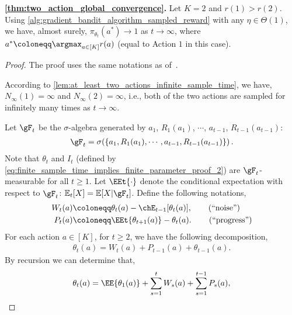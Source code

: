 \textbf{\cref{thm:two_action_global_convergence}.}
Let $K = 2$ and $r(1) > r(2)$. Using \cref{alg:gradient_bandit_algorithm_sampled_reward} with any $\eta \in \Theta(1)$, we have, almost surely, $\pi_{\theta_t}(a^*) \to 1$ as $t \to \infty$, where $a^* \coloneqq \argmax_{a \in [K]}{ r(a) }$ (equal to Action $1$ in this case).
\begin{proof}
The proof uses the same notations as of~\citep[Theorem 5.1]{mei2024stochastic}.

According to \cref{lem:at_least_two_actions_infinite_sample_time}, we have, $N_\infty(1) = \infty$ and $N_\infty(2) = \infty$, i.e., both of the two actions are sampled for infinitely many times as $t \to \infty$.

Let $\gF_t$ be the $\sigma$-algebra generated by $a_1$, $R_1(a_1)$, $\cdots$, $a_{t-1}$, $R_{t-1}(a_{t-1})$:
\begin{align}
\label{eq:two_action_global_convergence_proof_1}
    \gF_t = \sigma( \{ a_1, R_1(a_1), \cdots, a_{t-1}, R_{t-1}(a_{t-1}) \} )\,.
\end{align}
Note that $\theta_{t}$ and $I_t$ (defined by \cref{eq:finite_sample_time_implies_finite_parameter_proof_2}) are $\gF_t$-measurable for all $t\ge 1$. Let $\EEt{\cdot}$ denote the conditional expectation with respect to $\gF_t$: $\mathbb{E}_t[X] = \mathbb{E}[X|\gF_t]$. Define the following notations,
\begin{align}
\label{eq:two_action_global_convergence_proof_2b}
    W_t(a) &\coloneqq \theta_t(a) - \chE_{t-1}{[ \theta_t(a)]}, \qquad \left( \text{``noise''} \right) \\
\label{eq:two_action_global_convergence_proof_2c}
    P_t(a) &\coloneqq \EEt{\theta_{t+1}(a)} - \theta_t(a). \qquad \left( \text{``progress''} \right)
\end{align}
For each action $a \in [K]$, for $t \ge 2$, we have the following decomposition,
\begin{align}
\label{eq:two_action_global_convergence_proof_3}
    \theta_{t}(a) = W_t(a) + P_{t-1}(a) + \theta_{t-1}(a).
\end{align}
By recursion we can determine that,
\begin{align}
\label{eq:two_action_global_convergence_proof_4}
    \theta_t(a) = \EE{\theta_1(a)} + \sum_{s=1}^{t}{W_s(a)} + \sum_{s=1}^{t-1}{P_s(a)},
\end{align}

\end{proof}
